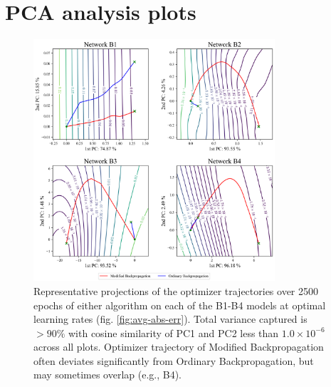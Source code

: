 \documentclass{article}
\theoremstyle{plain}
\theoremstyle{definition}
\theoremstyle{remark}
\begin{document}
\section{PCA analysis plots}
\label{app:pca}
\begin{figure}[H]
    \centering
    \includegraphics[width=0.8\textwidth]{./resources/pca_all.png}
    \caption{Representative projections of the optimizer trajectories over 2500 epochs of either algorithm on each of the B1-B4 models at optimal learning rates (fig. \ref{fig:avg-abs-err}). Total variance captured is $>90\%$ with cosine similarity of PC1 and PC2 less than $1.0\times10^{-6}$ across all plots. Optimizer trajectory of Modified Backpropagation often deviates significantly from Ordinary Backpropagation, but may sometimes overlap (e.g., B4).}
    \label{fig:big-pca}
\end{figure}
\end{document}
